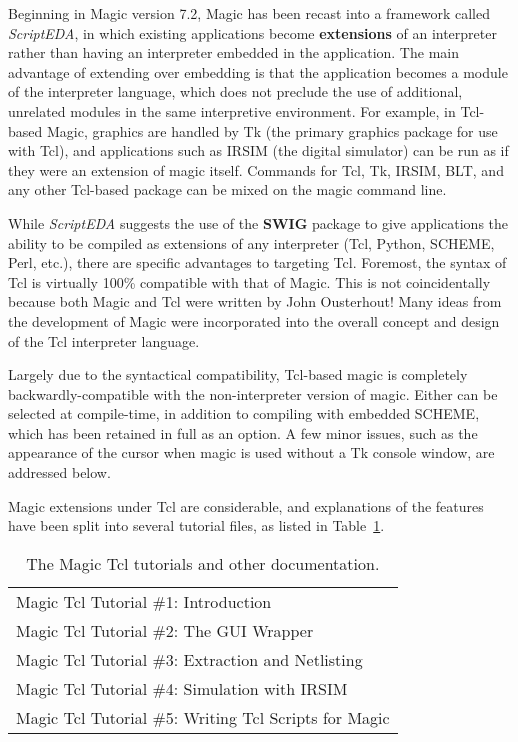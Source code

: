\documentclass[letterpaper,twoside,12pt]{article}
\begin{document}
Beginning in Magic version 7.2, Magic has been recast into a framework
called {\it ScriptEDA}, in which existing applications become
{\bfseries extensions} of an interpreter rather than having an interpreter
embedded in the application.  The main advantage of extending over
embedding is that the application becomes a module of the interpreter
language, which does not preclude the use of additional, unrelated
modules in the same interpretive environment.  For example, in Tcl-based
Magic, graphics are handled by Tk (the primary graphics package for
use with Tcl), and applications such as IRSIM (the digital simulator)
can be run as if they were an extension of magic itself.  Commands for
Tcl, Tk, IRSIM, BLT, and any other Tcl-based package can be mixed on
the magic command line.

While {\it ScriptEDA} suggests the use of the {\bfseries SWIG} package to give
applications the ability to be compiled as extensions of any interpreter
(Tcl, Python, SCHEME, Perl, etc.), there are specific advantages to
targeting Tcl.  Foremost, the syntax of Tcl is virtually 100\% compatible
with that of Magic.  This is not coincidentally because both Magic and
Tcl were written by John Ousterhout!  Many ideas from the development of
Magic were incorporated into the overall concept and design of the Tcl
interpreter language.

Largely due to the syntactical compatibility, Tcl-based magic is
completely backwardly-compatible with the non-interpreter version of
magic.  Either can be selected at compile-time, in addition to compiling
with embedded SCHEME, which has been retained in full as an option.
A few minor issues, such as the appearance of the cursor when magic is
used without a Tk console window, are addressed below.

Magic extensions under Tcl are considerable, and explanations of the
features have been split into several tutorial files, as listed in
Table~\ref{tutorials}.

\begin{table}[ht]
   \begin{center}
      \begin{tabular}{|l|} \hline
	Magic Tcl Tutorial \#1: Introduction \\
	Magic Tcl Tutorial \#2: The GUI Wrapper \\
	Magic Tcl Tutorial \#3: Extraction and Netlisting \\
	Magic Tcl Tutorial \#4: Simulation with IRSIM \\
	Magic Tcl Tutorial \#5: Writing Tcl Scripts for Magic \\ \hline
      \end{tabular}
   \end{center}
   \caption{The Magic Tcl tutorials and other documentation.}
   \label{tutorials}
\end{table}
\end{document}
